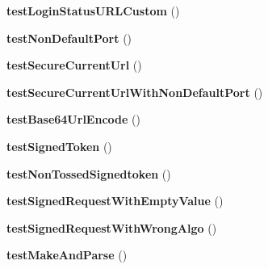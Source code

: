 \begin{DoxyCompactItemize}
\item 
\hypertarget{classPHPSDKTestCase_a8276bfd51418a90dc4e116538ffef2b3}{{\bfseries test\-Login\-Status\-U\-R\-L\-Custom} ()}\label{classPHPSDKTestCase_a8276bfd51418a90dc4e116538ffef2b3}

\item 
\hypertarget{classPHPSDKTestCase_a4ad6ff6c7f7cbeda61684d2d82b4fbaf}{{\bfseries test\-Non\-Default\-Port} ()}\label{classPHPSDKTestCase_a4ad6ff6c7f7cbeda61684d2d82b4fbaf}

\item 
\hypertarget{classPHPSDKTestCase_a11b14d5fc311d1b726163a72ddd77962}{{\bfseries test\-Secure\-Current\-Url} ()}\label{classPHPSDKTestCase_a11b14d5fc311d1b726163a72ddd77962}

\item 
\hypertarget{classPHPSDKTestCase_a21f39989a3ebaf29bef8743d40e91358}{{\bfseries test\-Secure\-Current\-Url\-With\-Non\-Default\-Port} ()}\label{classPHPSDKTestCase_a21f39989a3ebaf29bef8743d40e91358}

\item 
\hypertarget{classPHPSDKTestCase_adaf8f1908eb04ad32ce065d4631eb3c3}{{\bfseries test\-Base64\-Url\-Encode} ()}\label{classPHPSDKTestCase_adaf8f1908eb04ad32ce065d4631eb3c3}

\item 
\hypertarget{classPHPSDKTestCase_afebedd4aa2704b604e41e09471d112fd}{{\bfseries test\-Signed\-Token} ()}\label{classPHPSDKTestCase_afebedd4aa2704b604e41e09471d112fd}

\item 
\hypertarget{classPHPSDKTestCase_a946f6f98464a9acca7d22b0e67be52db}{{\bfseries test\-Non\-Tossed\-Signedtoken} ()}\label{classPHPSDKTestCase_a946f6f98464a9acca7d22b0e67be52db}

\item 
\hypertarget{classPHPSDKTestCase_a6814196e6ef4e2cc70eff23c5928e531}{{\bfseries test\-Signed\-Request\-With\-Empty\-Value} ()}\label{classPHPSDKTestCase_a6814196e6ef4e2cc70eff23c5928e531}

\item 
\hypertarget{classPHPSDKTestCase_a4956b4b5239b8f724ef257466b1357fb}{{\bfseries test\-Signed\-Request\-With\-Wrong\-Algo} ()}\label{classPHPSDKTestCase_a4956b4b5239b8f724ef257466b1357fb}

\item 
\hypertarget{classPHPSDKTestCase_ae8a683a014d6504dd69a3fa07ab7dcae}{{\bfseries test\-Make\-And\-Parse} ()}\label{classPHPSDKTestCase_ae8a683a014d6504dd69a3fa07ab7dcae}


\end{DoxyCompactItemize}
